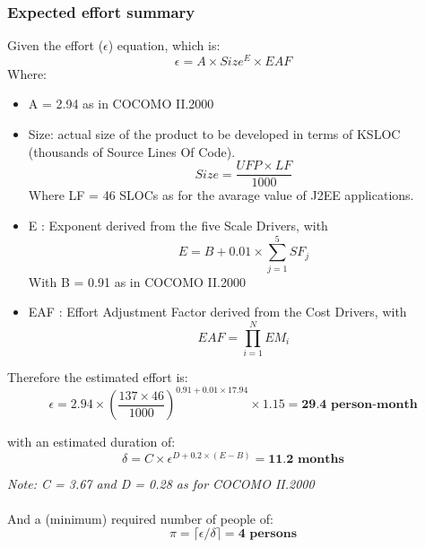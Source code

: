 \subsubsection{Expected effort summary}
Given the effort ($\epsilon$) equation, which is:
    \begin{equation*}
        \epsilon = A \times Size^E \times EAF
    \end{equation*}
    Where:
    \begin{itemize}
        \item A = 2.94 as in COCOMO II.2000

        \item Size: actual size of the product to be developed in terms of KSLOC (thousands of Source Lines Of Code).
        \begin{equation*}
            Size = \frac{UFP \times LF}{1000}
        \end{equation*}
        Where LF = 46 SLOCs as for the avarage value of J2EE applications.

        \item E : Exponent derived from the five Scale Drivers, with
        \begin{equation*}
            E = B + 0.01 \times \sum_{j=1}^5 SF_j
        \end{equation*}
        With B = 0.91 as in COCOMO II.2000

        \item EAF : Effort Adjustment Factor derived from the Cost Drivers, with
        \begin{equation*}
            EAF = \prod_{i=1}^N EM_i
        \end{equation*}
    \end{itemize}


Therefore the estimated effort is:
\begin{equation*}
        \epsilon = 2.94 \times (\frac{137\times 46}{1000})^{0.91+0.01\times 17.94} \times 1.15 = \textbf{29.4 person-month}
\end{equation*}

with an estimated duration of:
\begin{equation*}
        \delta = C \times \epsilon^{D+0.2\times(E-B)} = 
        \textbf{11.2 months}
\end{equation*}

\textit{Note: C = 3.67 and D = 0.28 as for COCOMO II.2000}\\\\

And a (minimum) required number of people of:
\begin{equation*}
        \pi = \lceil \epsilon / \delta \rceil = \textbf{4 persons}
\end{equation*}